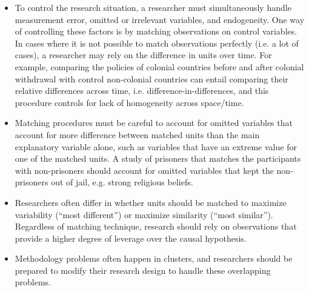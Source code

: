 \documentclass[11pt,letterpaper]{article}
\begin{document}
\begin{itemize}
\item To control the research situation, a researcher must simultaneously handle measurement error, omitted or irrelevant variables, and endogeneity. One way of controlling these factors is by matching observations on control variables. In cases where it is not possible to match observations perfectly (i.e. a lot of cases), a researcher may rely on the difference in units over time. For example, comparing the policies of colonial countries before and after colonial withdrawal with control non-colonial countries can entail comparing their relative differences across time, i.e. difference-in-differences, and this procedure controls for lack of homogeneity across space/time.
\item Matching procedures must be careful to account for omitted variables that account for more difference between matched units than the main explanatory variable alone, such as variables that have an extreme value for one of the matched units. A study of prisoners that matches the participants with non-prisoners should account for omitted variables that kept the non-prisoners out of jail, e.g. strong religious beliefs. 
\item Researchers often differ in whether units should be matched to maximize variability (``most different'') or maximize similarity (``most similar''). Regardless of matching technique, research should rely on observations that provide a higher degree of leverage over the causal hypothesis. 
\item Methodology problems often happen in clusters, and researchers should be prepared to modify their research design to handle these overlapping problems.
\end{itemize}

\end{document}
